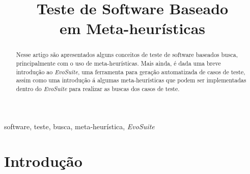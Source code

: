 \documentclass[conference]{IEEEtran}
\begin{document}
\title{Teste de Software Baseado  \\ em Meta-heurísticas
}

\author{
\and
{}
\and
{}
}

\maketitle

\begin{abstract}

Nesse artigo são apresentados alguns conceitos de teste de software baseados busca, principalmente com o uso de meta-heurísticas. Mais ainda, é dada uma breve introdução ao \emph{EvoSuite}, uma ferramenta para geração automatizada de casos de teste, assim como uma introdução á algumas meta-heurísticas que podem ser implementadas dentro do \emph{EvoSuite} para realizar as buscas dos casos de teste.
\end{abstract}

\begin{IEEEkeywords}
software, teste, busca, meta-heurística, \emph{EvoSuite}
\end{IEEEkeywords}

\section{Introdução}
\end{document}
